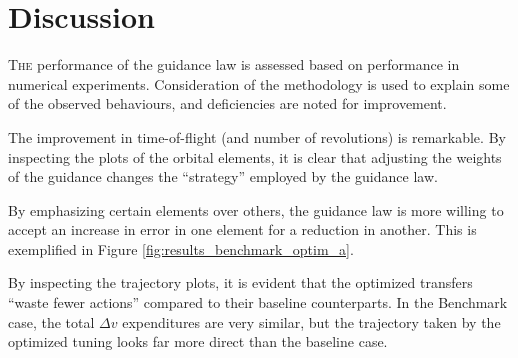 \chapter{Discussion}
\label{chp:discussion}

\lettrine{T}{he} performance of the guidance law is assessed based on performance in numerical experiments. Consideration of the methodology is used to explain some of the observed behaviours, and deficiencies are noted for improvement.

The improvement in time-of-flight (and number of revolutions) is remarkable. By inspecting the plots of the orbital elements, it is clear that adjusting the weights of the guidance changes the ``strategy'' employed by the guidance law.

By emphasizing certain elements over others, the guidance law is more willing to accept an increase in error in one element for a reduction in another. This is exemplified in Figure \ref{fig:results_benchmark_optim_a}.

By inspecting the trajectory plots, it is evident that the optimized transfers ``waste fewer actions'' compared to their baseline counterparts. In the Benchmark case, the total $\Delta v$ expenditures are very similar, but the trajectory taken by the optimized tuning looks far more direct than the baseline case.